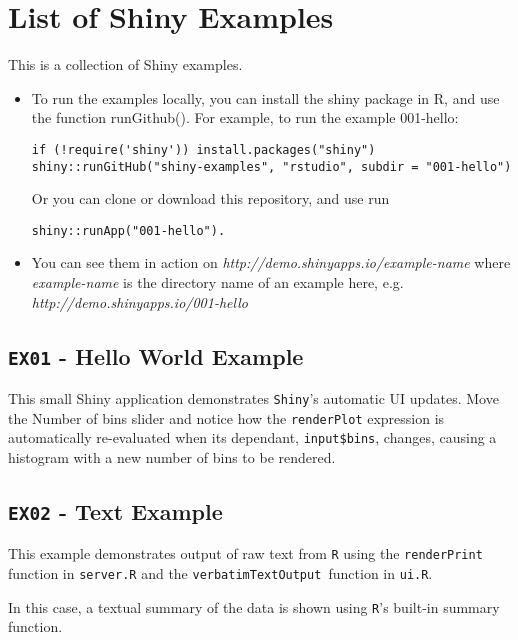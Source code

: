 \documentclass[12pt]{article}
\begin{document}
\section{List of Shiny Examples}
This is a collection of Shiny examples. 

\begin{itemize}
\item To run the examples locally, you can install the shiny package in R, and use the function runGithub(). For example, to run the example 001-hello:

\begin{verbatim}
if (!require('shiny')) install.packages("shiny")
shiny::runGitHub("shiny-examples", "rstudio", subdir = "001-hello")
\end{verbatim}
Or you can clone or download this repository, and use run 
\begin{verbatim}
shiny::runApp("001-hello").
\end{verbatim}
\item 
You can see them in action on \textit{http://demo.shinyapps.io/example-name} where \textit{example-name} is the directory name of an example here, e.g. \textit{http://demo.shinyapps.io/001-hello}
\end{itemize}


\subsection{\texttt{EX01} - Hello World Example }
This small Shiny application demonstrates \texttt{Shiny}'s automatic UI updates. Move the Number of bins slider and notice how the \texttt{renderPlot} expression is automatically re-evaluated when its dependant, \texttt{input\$bins}, changes, causing a histogram with a new number of bins to be rendered.
\subsection{\texttt{EX02} - Text Example}
This example demonstrates output of raw text from \texttt{R} using the \texttt{renderPrint} function in \texttt{server.R} and the \texttt{verbatimTextOutput }function in \texttt{ui.R}. 

\noindent In this case, a textual summary of the data is shown using \texttt{R}'s built-in summary function.
\end{document}
